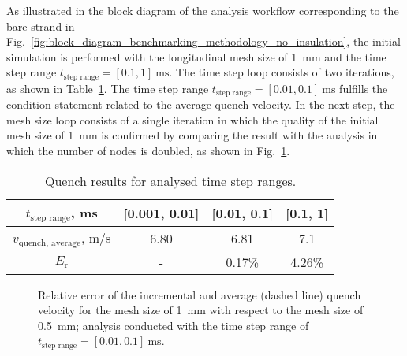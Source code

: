 As illustrated in the block diagram of the analysis workflow corresponding to the bare strand in Fig.~\ref{fig:block_diagram_benchmarking_methodology_no_insulation}, the initial simulation is performed with the longitudinal mesh size of 1~mm and the time step range $t_\text{step range}=[0.1, 1]~\text{ms}$. The time step loop consists of two iterations, as shown in Table~\ref{table: 1d_qv_benchmarking_results_heat_balance_no_insulation}. The time step range $t_\text{step range}=[0.01, 0.1]~\text{ms}$ fulfills the condition statement related to the average quench velocity. In the next step, the mesh size loop consists of a single iteration in which the quality of the initial mesh size of 1~mm is confirmed by comparing the result with the analysis in which the number of nodes is doubled, as shown in Fig.~\ref{fig: q_vel_modelling_v_quench_rel_error_no_insulation}. 

\begin{table}[H]
    \caption{Quench results for analysed time step ranges.} 
    \vspace{-1.em} 
    \fontsize{10}{10}
    \selectfont 
    \renewcommand{\arraystretch}{1.5}
    \begin{center}
        \begin{tabular}{ cccc }  
        \hline
        $t_\text{step range}$, ms & [0.001, 0.01] & [0.01, 0.1] & [0.1, 1] \\
        \hline
        $v_\text{quench, average}$, m/s & 6.80 & 6.81 & 7.1 \\
        $E_\text{r}$ & - & 0.17\% & 4.26\% \\
        \hline 
        \end{tabular}
    \end{center}  
     \label{table: 1d_qv_benchmarking_results_heat_balance_no_insulation} 
 \end{table}

\begin{figure}[H]
\centering
    \caption{Relative error of the incremental and average (dashed line) quench velocity for the mesh size of 1~mm with respect to the mesh size of 0.5~mm; analysis conducted with the time step range of $t_\text{step range}=[0.01, 0.1]~\text{ms}$.}
    \label{fig: q_vel_modelling_v_quench_rel_error_no_insulation}
\end{figure}

